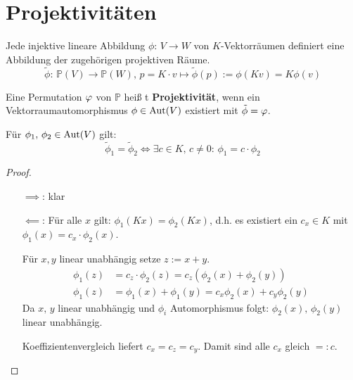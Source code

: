 \documentclass[parskip,a4paper,twoside,DIV15,BCOR12mm]{scrbook}
\begin{document}
\section{Projektivitäten}
\begin{prerem}
Jede injektive lineare Abbildung \(\phi:\,V\to W\) von \(K\)-Vektorräumen
definiert eine Abbildung der zugehörigen projektiven Räume.
\[
\tilde{\phi}:\,\mathbb{P}(V)\to\mathbb{P}(W),\,
    p=K\cdot v\mapsto\tilde{\phi}(p):=\phi(Kv)=K\phi(v)
\]
\end{prerem}
\begin{definition}
Eine Permutation \(\varphi\) von \(\mathbb{P}\) heiß t \textbf{Projektivität},
wenn ein Vektorraumautomorphismus \(\phi\in\operatorname{Aut}(V)\) existiert mit
\(\tilde{\phi}=\varphi\).
\end{definition}
\begin{lemma}
Für \(\phi_{1},\,\phi_{2}\in\operatorname{Aut}(V)\) gilt:
\[
\tilde{\phi}_{1}=\tilde{\phi}_{2}\Longleftrightarrow
    \exists c\in K,\,c\neq0:\,\phi_{1}=c\cdot\phi_{2}
\]
\end{lemma}
\begin{proof}
\begin{itemize}
\item[\(\implies\):] klar
\item[\(\impliedby\):] Für alle \(x\) gilt: \(\phi_{1}(Kx)=\phi_{2}(Kx)\), 
d.h. es existiert ein \(c_{x}\in K\) mit \(\phi_{1}(x)=c_{x}\cdot\phi_{2}(x)\).

Für \(x,y\) linear unabhängig setze \(z:=x+y\).
\begin{align*}
\phi_{1}(z)&=c_{z}\cdot\phi_{2}(z)=c_{z}\left(\phi_{2}(x)+\phi_{2}(y)\right)\\
\phi_{1}(z)&=\phi_{1}(x)+\phi_{1}(y)=c_{x}\phi_{2}(x)+c_{y}\phi_{2}(y)
\end{align*}
Da \(x,\,y\) linear unabhängig und \(\phi_{i}\) Automorphismus folgt:
\(\phi_{2}(x),\,\phi_{2}(y)\) linear unabhängig.

Koeffizientenvergleich liefert \(c_{x}=c_{z}=c_{y}\). Damit sind alle \(c_{x}\)
gleich \(=:c\).
\end{itemize}
\end{proof}
\begin{comment}
\begin{enumerate}
\item Die Projektivitäten von \(\mathbb{P}\) bilden eine Gruppe, wobei
\(\tilde{\phi}_{1}\circ\tilde{\phi}_{2}=\tilde{\phi_{1}\circ\phi_{2}}\) und 
\(\tilde{\phi}_{1}^{-1}=\tilde{\phi_{1}^{-1}}\) ist.
\item Jede Projektivität bildet einen projektiven Teilraum auf einen 
projektiven Teilraum gleicher Dimension ab.
\end{enumerate}
\end{comment}
\end{document}

